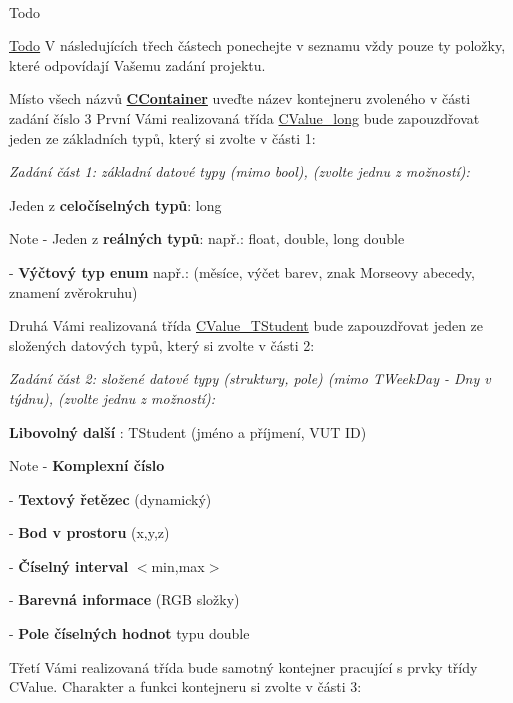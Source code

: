 ~\newline
\begin{DoxyRefDesc}{Todo}
\item[\hyperlink{todo__todo000001}{Todo}]V následujících třech částech ponechejte v seznamu vždy pouze ty položky, které odpovídají Vašemu zadání projektu.\end{DoxyRefDesc}


Místo všech názvů {\bfseries  {\ttfamily \hyperlink{class_c_container}{C\+Container}}} uveďte název kontejneru zvoleného v části zadání číslo 3 První Vámi realizovaná třída {\ttfamily \hyperlink{namespace_c_value__long}{C\+Value\+\_\+long}} bude zapouzdřovat jeden ze základních typů, který si zvolte v části 1\+:

{\itshape Zadání část 1\+: základní datové typy (mimo bool), (zvolte jednu z možností)\+:}
\begin{DoxyItemize}
\item Jeden z {\bfseries celočíselných typů}\+: {\ttfamily long} \begin{DoxyNote}{Note}
-\/ Jeden z {\bfseries reálných typů}\+: např.\+: {\ttfamily float}, {\ttfamily double}, {\ttfamily long} {\ttfamily double} 

-\/ {\bfseries Výčtový typ enum} např.\+: (měsíce, výčet barev, znak Morseovy abecedy, znamení zvěrokruhu)
\end{DoxyNote}
Druhá Vámi realizovaná třída {\ttfamily \hyperlink{namespace_c_value___t_student}{C\+Value\+\_\+\+T\+Student}} bude zapouzdřovat jeden ze složených datových typů, který si zvolte v části 2\+:
\end{DoxyItemize}

{\itshape Zadání část 2\+: složené datové typy (struktury, pole) (mimo T\+Week\+Day -\/ Dny v týdnu), (zvolte jednu z možností)\+:}
\begin{DoxyItemize}
\item {\bfseries Libovolný další} \+: T\+Student (jméno a příjmení, V\+UT ID) \begin{DoxyNote}{Note}
-\/ {\bfseries Komplexní číslo} 

-\/ {\bfseries Textový řetězec} (dynamický) 

-\/ {\bfseries Bod v prostoru} (x,y,z) 

-\/ {\bfseries Číselný interval} $<$min,max$>$ 

-\/ {\bfseries Barevná informace} (R\+GB složky) 

-\/ {\bfseries Pole číselných hodnot} typu {\ttfamily double} 
\end{DoxyNote}
Třetí Vámi realizovaná třída bude samotný kontejner pracující s prvky třídy {\ttfamily C\+Value}. Charakter a funkci kontejneru si zvolte v části 3\+:
\end{DoxyItemize}


